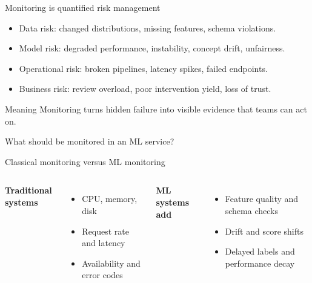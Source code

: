 \begin{frame}{Monitoring is quantified risk management}
\begin{itemize}
\item Data risk: changed distributions, missing features, schema violations.
\item Model risk: degraded performance, instability, concept drift, unfairness.
\item Operational risk: broken pipelines, latency spikes, failed endpoints.
\item Business risk: review overload, poor intervention yield, loss of trust.
\end{itemize}
\begin{block}{Meaning}
Monitoring turns hidden failure into visible evidence that teams can act on.
\end{block}
\coursefooter
\end{frame}

\begin{frame}{What should be monitored in an ML service?}
\centering
{}
\coursefooter
\end{frame}

\begin{frame}{Classical monitoring versus ML monitoring}
\begin{columns}[T]
\textbf{Traditional systems}
\begin{itemize}
\item CPU, memory, disk
\item Request rate and latency
\item Availability and error codes
\end{itemize}
\textbf{ML systems add}
\begin{itemize}
\item Feature quality and schema checks
\item Drift and score shifts
\item Delayed labels and performance decay
\end{itemize}
\end{columns}
\coursefooter
\end{frame}

